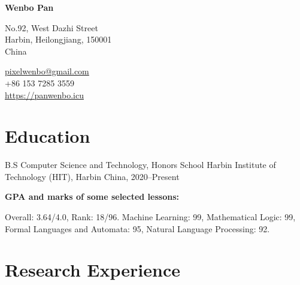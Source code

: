 \documentclass[11pt,letterpaper]{report}
\newcommand{\myname}{Wenbo Pan}
\newcommand{\namefont}[1]{{\normalfont\bfseries\Huge{#1}}}
\begin{document}
\raggedright{}

\namefont{\myname}

\vspace{1em}
\begin{minipage}[t]{0.700\textwidth}
No.92, West Dazhi Street \\
Harbin, Heilongjiang, 150001 \\
China
\end{minipage}
\begin{minipage}[t]{0.295\textwidth}
\flushright{}
\href{mailto:pixelwenbo@gmail.com}{pixelwenbo@gmail.com} \\
+86 153 7285 3559 \\
\href{https://panwenbo.icu}{https://panwenbo.icu}
\end{minipage}


\section*{Education}

\begin{tablist}

\item[B.S] \tab{}Computer Science and Technology, Honors School Harbin Institute of Technology (HIT), Harbin China, 2020--Present \\
\item[] \tab{} \textbf{GPA and marks of some selected lessons:}
\item[] \tab{} Overall: 3.64/4.0, Rank: 18/96. \tab{} Machine Learning: 99, Mathematical Logic: 99,  Formal Languages and Automata: 95,  Natural Language Processing: 92.
\end{tablist}

\section*{Research Experience}
\end{document}
